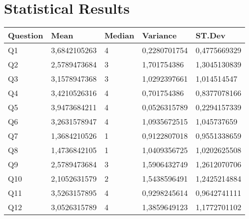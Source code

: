 \begin{appendices}
	
	\label{apx:nor_questionnaire}
	\chapter{Statistical Results}
	\label{apx:stat_results}
	\begin{table}[!ht]
		\centering
		\label{tab:stat_results}
		\begin{tabular}{|l|l|l|l|l|}
			\hline
			\textbf{Question} & \textbf{Mean} & \textbf{Median} & \textbf{Variance} & \textbf{ST.Dev} \\ \hline
			Q1                & 3,6842105263  & 4               & 0,2280701754      & 0,4775669329    \\ \hline
			Q2                & 2,5789473684  & 3               & 1,701754386       & 1,3045130839    \\ \hline
			Q3                & 3,1578947368  & 3               & 1,0292397661      & 1,014514547     \\ \hline
			Q4                & 3,4210526316  & 4               & 0,701754386       & 0,8377078166    \\ \hline
			Q5                & 3,9473684211  & 4               & 0,0526315789      & 0,2294157339    \\ \hline
			Q6                & 3,2631578947  & 4               & 1,0935672515      & 1,045737659     \\ \hline
			Q7                & 1,3684210526  & 1               & 0,9122807018      & 0,9551338659    \\ \hline
			Q8                & 1,4736842105  & 1               & 1,0409356725      & 1,0202625508    \\ \hline
			Q9                & 2,5789473684  & 3               & 1,5906432749      & 1,2612070706    \\ \hline
			Q10               & 2,1052631579  & 2               & 1,5438596491      & 1,2425214884    \\ \hline
			Q11               & 3,5263157895  & 4               & 0,9298245614      & 0,9642741111    \\ \hline
			Q12               & 3,0526315789  & 4               & 1,3859649123      & 1,1772701102    \\ \hline

\end{tabular}
\end{table}
\end{appendices}
